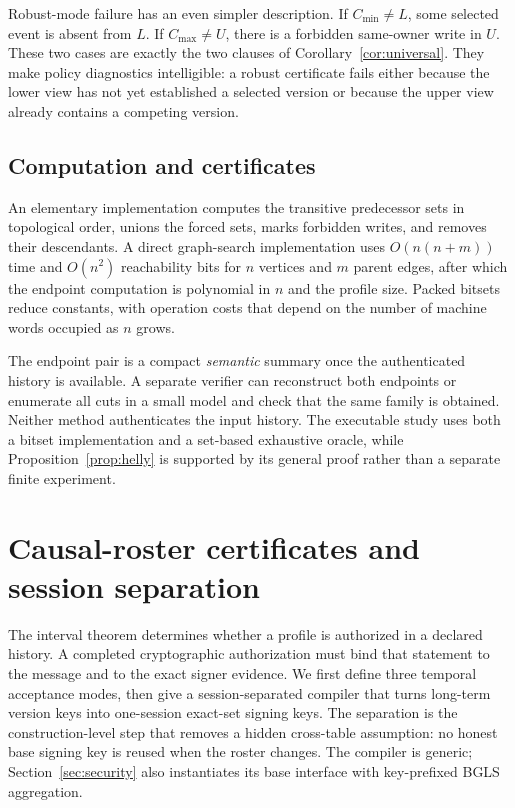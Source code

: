 \documentclass[11pt]{article}
\theoremstyle{definition}
\newcommand{\lo}{C_{\min}}
\newcommand{\hi}{C_{\max}}
\begin{document}
Robust-mode failure has an even simpler description.  If $\lo\neq L$, some selected event is absent from $L$.  If $\hi\neq U$, there is a forbidden same-owner write in $U$.  These two cases are exactly the two clauses of Corollary~\ref{cor:universal}.  They make policy diagnostics intelligible: a robust certificate fails either because the lower view has not yet established a selected version or because the upper view already contains a competing version.

\subsection{Computation and certificates}
An elementary implementation computes the transitive predecessor sets in topological order, unions the forced sets, marks forbidden writes, and removes their descendants. A direct graph-search implementation uses $O(n(n+m))$ time and $O(n^2)$ reachability bits for $n$ vertices and $m$ parent edges, after which the endpoint computation is polynomial in $n$ and the profile size. Packed bitsets reduce constants, with operation costs that depend on the number of machine words occupied as $n$ grows.

The endpoint pair is a compact \emph{semantic} summary once the authenticated history is available. A separate verifier can reconstruct both endpoints or enumerate all cuts in a small model and check that the same family is obtained. Neither method authenticates the input history. The executable study uses both a bitset implementation and a set-based exhaustive oracle, while Proposition~\ref{prop:helly} is supported by its general proof rather than a separate finite experiment.

\section{Causal-roster certificates and session separation}\label{sec:compiler}
The interval theorem determines whether a profile is authorized in a declared history.  A completed cryptographic authorization must bind that statement to the message and to the exact signer evidence.  We first define three temporal acceptance modes, then give a session-separated compiler that turns long-term version keys into one-session exact-set signing keys.  The separation is the construction-level step that removes a hidden cross-table assumption: no honest base signing key is reused when the roster changes.  The compiler is generic; Section~\ref{sec:security} also instantiates its base interface with key-prefixed BGLS aggregation.
\end{document}
